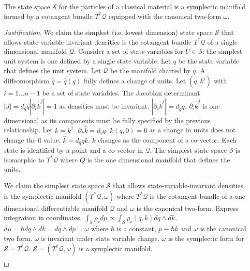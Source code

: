 \documentclass[smallextended]{svjour3}
\numberwithin{equation}{section}
\newenvironment{justification}{\emph{Justification}.}{\hfill\(\qed\)}
\begin{document}
\begin{prop}\label{prop:symplectic_manifold}
The state space $\mathcal{S}$ for the particles of a classical material is a symplectic manifold formed by a cotangent bundle $T^*\mathcal{Q}$ equipped with the canonical two-form $\omega$.
\end{prop}

\begin{justification}
	We claim the simplest (i.e. lowest dimension) state space $\mathcal{S}$ that allows state-variable-invariant densities is the cotangent bundle $T^*\mathcal{Q}$ of a single dimensional manifold $\mathcal{Q}$. Consider a set of state variables for $U \in \mathcal{S}$: the simplest unit system is one defined by a single state variable. Let $q$ be the state variable that defines the unit system. Let $\mathcal{Q}$ be the manifold charted by $q$. A diffeomorphism $\hat{q}=\hat{q}(q)$ fully defines a change of units. Let $(q,k^i)$ with $i=1...n-1$ be a set of state variables. The Jacobian determinant $|J| = d_q\hat{q} |\partial_i\hat{k}^j|=1$ as densities must be invariant. $|\partial_i \hat{k}^j| = d_{\hat{q}}q$. $\partial_i \hat{k}^j$ is one dimensional as its components must be fully specified by the previous relationship. Let $k=k^1$. $\partial_k \hat{k} = d_{\hat{q}}q$. $\hat{k}(q,0) = 0$ as a change in units does not change the $0$ value. $\hat{k} = d_{\hat{q}}q k$. $k$ changes as the component of a co-vector. Each state is identified by a point and a co-vector in $\mathcal{Q}$. The simplest state space $\mathcal{S}$ is isomorphic to $T^*\mathcal{Q}$ where $Q$ is the one dimensional manifold that defines the units.
	
	We claim the simplest state space $\mathcal{S}$ that allows state-variable-invariant densities is the symplectic manifold $(T^*\mathcal{Q}, \omega)$ where $T^*\mathcal{Q}$ is the cotangent bundle of a one dimensional differentiable manifold $\mathcal{Q}$ and $\omega$ is the canonical two-form. Express integration in coordinates. $\int_{\mathcal{S}} \rho_\mathcal{c} d\mu \propto \int_{\mathcal{S}} \rho_\mathcal{c}(q, k) dq \wedge dk$. $d\mu = \hbar dq \wedge dk = dq \wedge dp = \omega$ where $\hbar$ is a constant, $p\equiv \hbar k$  and $\omega$ is the canonical two form. $\omega$ is invariant under state variable change. $\omega$ is the symplectic form for $\mathcal{S}=T^*\mathcal{Q}$. $\mathcal{S} = (T^*\mathcal{Q}, \omega)$ is a symplectic manifold.
	

\end{justification}
\end{document}
